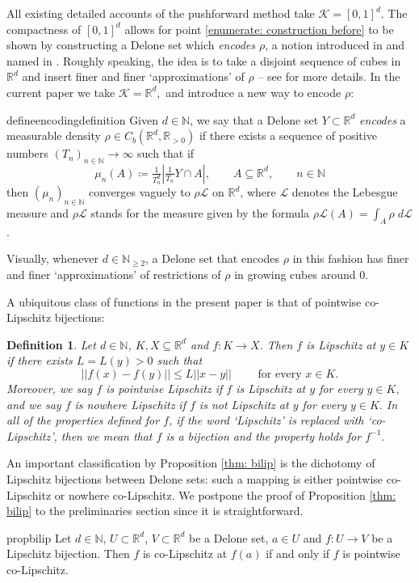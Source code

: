 \documentclass{article}
\newtheorem{define}[thm]{Definition}
\newcommand{\R}{\mathbb{R}}
\newcommand{\N}{\mathbb{N}}
\newcommand{\leb}{\mc{L}}
\newcommand{\mc}[1]{\mathcal{#1}}
\begin{document}
All existing detailed accounts of the pushforward method take $\mathcal{K} = [0,1]^d$. The compactness of $[0,1]^d$ allows for point \ref{enumerate: construction before} to be shown by constructing a Delone set which \emph{encodes $\rho$}, a notion introduced in \cite{burago1998separated} and named in \cite[Definition~$1.1$]{bhat2025fast}. Roughly speaking, the idea is to take a disjoint sequence of cubes in $\R^d$ and insert finer and finer `approximations' of $\rho$ -- see \cite{bhat2025fast,dymond2018mapping} for more details. In the current paper we take $\mathcal{K} = \R^d,$ and introduce a new way to encode $\rho:$
\begin{restatable}{define}{encodingdefinition} \label{defn: Y encoding rho}
    Given $d \in \N$, we say that a Delone set $Y \subset \R^d$ \emph{encodes} a measurable density ${\rho\in C_b(\R^d,\R_{>0})}$ if there exists a sequence of positive numbers $(T_n)_{n \in \N} \to \infty$ such that if 
    \begin{equation*} \label{eqn: Y encoding rho}
        \mu_n(A) \coloneqq  \tfrac{1}{T_n^d}{|\tfrac{1}{T_n}Y \cap A|,} \qquad A \subseteq \R^d, \qquad n \in \N
    \end{equation*} then $(\mu_n)_{n \in \N}$ converges vaguely to $\rho \mathcal{L}$ on $\R^d$, where $\leb$ denotes the Lebesgue measure and $\rho\leb$ stands for the measure given by the formula $\rho\leb(A)=\int_{A}\rho\;d\leb$.
\end{restatable} Visually, whenever $d \in \N_{\geq 2}$, a Delone set that encodes $\rho$ in this fashion has finer and finer `approximations' of restrictions of $\rho$ in growing cubes around $0.$

A ubiquitous class of functions in the present paper is that of pointwise co-Lipschitz bijections:
\begin{define} \label{define: bilip with set}
        Let $d \in \N$, $K,X \subseteq \R^d$ and $f:K \to X$. Then $f$ is \emph{Lipschitz at $y \in K$} if there exists $L=L(y)>0$ such that $$||f(x)-f(y)||\leq L||x-y|| \qquad \text{ for every }x \in K.$$ Moreover, we say $f$ is \emph{pointwise Lipschitz} if $f$ is Lipschitz at $y$ for every $y \in K,$ and we say $f$ is \emph{nowhere Lipschitz} if $f$ is not Lipschitz at $y$ for every $y \in K.$ In all of the properties defined for $f$, if the word `Lipschitz' is replaced with `co-Lipschitz', then we mean that $f$ is a bijection and the property holds for $f^{-1}.$
    \end{define}  
    An important classification by Proposition \ref{thm: bilip} is the dichotomy of Lipschitz bijections between Delone sets: such a mapping is either pointwise co-Lipschitz or nowhere co-Lipschitz. We postpone the proof of Proposition \ref{thm: bilip} to the preliminaries section since it is straightforward.
\begin{restatable}{prop}{bilip} \label{thm: bilip}
    Let $d \in \N$, $U \subset \R^d$, $V \subset \R^d$ be a Delone set, $a \in U$ and $f:U \to V$ be a Lipschitz bijection. Then $f$ is co-Lipschitz at $f(a)$ if and only if $f$ is pointwise co-Lipschitz.
\end{restatable}
\end{document}
